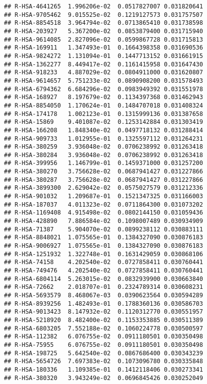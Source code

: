 \documentclass[
]{article}
\begin{document}
\begin{verbatim}
## R-HSA-4641265  1.996206e-02  0.0517827007 0.031820641
## R-HSA-9705462  9.015525e-02  0.1219127573 0.031757507
## R-HSA-8854518  3.964794e-02  0.0713865410 0.031738598
## R-HSA-203927   5.367200e-02  0.0853879400 0.031715940
## R-HSA-9614085  2.827096e-02  0.0599867728 0.031715813
## R-HSA-169911   1.347493e-01  0.1664398358 0.031690536
## R-HSA-9824272  1.131094e-01  0.1447713152 0.031661915
## R-HSA-1362277  8.449417e-02  0.1161415958 0.031647430
## R-HSA-918233   4.887029e-02  0.0804911000 0.031620807
## R-HSA-9614657  5.751233e-02  0.0890908200 0.031578493
## R-HSA-6794362  6.684296e-02  0.0983949392 0.031551978
## R-HSA-168927   8.197679e-02  0.1134397368 0.031462943
## R-HSA-8854050  1.170624e-01  0.1484707018 0.031408324
## R-HSA-174178   1.002123e-01  0.1315999136 0.031387658
## R-HSA-15869    9.401087e-02  0.1253142884 0.031303419
## R-HSA-166208   1.848340e-02  0.0497718132 0.031288414
## R-HSA-909733   1.012955e-01  0.1325597112 0.031264231
## R-HSA-380259   3.936048e-02  0.0706238992 0.031263418
## R-HSA-380284   3.936048e-02  0.0706238992 0.031263418
## R-HSA-399956   1.146799e-01  0.1459371000 0.031257200
## R-HSA-380270   3.756628e-02  0.0687941427 0.031227866
## R-HSA-380287   3.756628e-02  0.0687941427 0.031227866
## R-HSA-3899300  2.629042e-02  0.0575027579 0.031212336
## R-HSA-901032   1.209687e-01  0.1521347325 0.031166003
## R-HSA-187037   4.011323e-02  0.0711864300 0.031073202
## R-HSA-1169408  4.915498e-02  0.0802144150 0.031059436
## R-HSA-428890   7.886584e-02  0.1098007489 0.030934909
## R-HSA-71387    5.904070e-02  0.0899238112 0.030883111
## R-HSA-8848021  1.075565e-01  0.1384327090 0.030876183
## R-HSA-9006927  1.075565e-01  0.1384327090 0.030876183
## R-HSA-1251932  1.322748e-01  0.1631429059 0.030868106
## R-HSA-74158    4.202540e-02  0.0727858411 0.030760441
## R-HSA-749476   4.202540e-02  0.0727858411 0.030760441
## R-HSA-6804114  5.263015e-02  0.0832939900 0.030663840
## R-HSA-72662    2.018707e-01  0.2324789314 0.030608231
## R-HSA-5693579  8.468067e-03  0.0390623564 0.030594289
## R-HSA-8939256  1.482493e-01  0.1788360136 0.030586703
## R-HSA-9013423  8.147932e-02  0.1120312770 0.030551957
## R-HSA-5218920  8.482400e-02  0.1153353885 0.030511389
## R-HSA-6803205  7.552188e-02  0.1060224778 0.030500597
## R-HSA-112382   6.076755e-02  0.0911180501 0.030350498
## R-HSA-75955    6.076755e-02  0.0911180501 0.030350498
## R-HSA-198725   5.642540e-02  0.0867686400 0.030343239
## R-HSA-5654726  7.697383e-02  0.1073096780 0.030335848
## R-HSA-180336   1.109385e-01  0.1412118406 0.030273341
## R-HSA-380320   3.943249e-02  0.0696845426 0.030252049

\end{verbatim}
\end{document}
